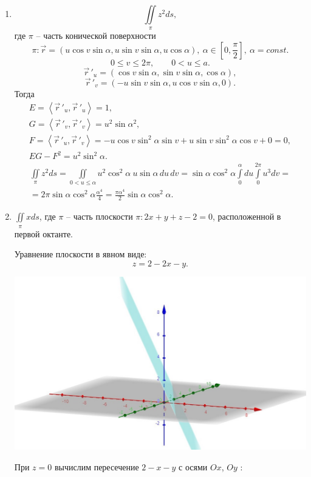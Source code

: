\documentclass[../../main.tex]{subfiles}
\begin{document}
	\begin{exmps}
	
	\,
	
	\begin{enumerate}
	\item
	\[ \iint \limits_\pi z^2 ds,\] где $\pi$ \--- часть конической 
	поверхности
	\[\pi: \vec{r} = (u\cos v\sin \alpha, u\sin v\sin\alpha, 
	u\cos\alpha) , \ 
	  \alpha\in \left[0, \frac{\pi}{2}\right], \ \alpha = const.\] 
	\[0 \leq v \leq 2\pi, \qquad 0 < u \leq a. \]
	\[\vec r\,'_u = (\cos v \sin \alpha, \sin v \sin \alpha, \cos \alpha), \]
	\[\vec r\,'_v = (-u \sin v \sin \alpha, u \cos v \sin \alpha, 0).  \]
	Тогда
	\begin{gather*}
	E = \left<\vec r\,'_u, \vec r\,'_u\right>= 1, \\ G = \left<\vec r\,'_v, \vec 
	r\,'_v\right> = u^2 \sin \alpha^2, \\
	F = \left<\vec r\,'_u, \vec r\,'_v\right> = -u \cos v \sin^2 \alpha \sin 
	v +
	 u \sin v \sin ^2 \alpha \cos v+0 =0, \\
	EG - F^2 = u^2 \sin^2 \alpha.
	\end{gather*}
	\begin{gather*}
	\iint \limits_\pi z^2 ds = \iint\limits_{0<u \leq \alpha} u^2 \cos^2 \alpha
	 \ u \sin \alpha \,du\, dv = \sin \alpha \cos ^2 \alpha \int \limits_0^\alpha 
	 du
	  \int \limits_0 ^{2\pi} u^3 dv = \\ = 2 \pi \sin \alpha \cos ^2 \alpha 
	  \frac{\alpha^4}{4} =
	   \frac{\pi \alpha^4}{2} \sin \alpha \cos^2 \alpha.
	\end{gather*}
	\item 
	$\displaystyle\iint \limits_\pi x ds$, где $\pi$ \--- часть плоскости
	$\pi : 2x+y+z-2=0$, расположенной в первой октанте.
	
	Уравнение плоскости в явном виде:
	\[z = 2 -2x -y.\]
	\begin{center}
	 \includegraphics[scale = 0.2]{lec23-2.jpg}
	\end{center}	
	При $z = 0$ вычислим пересечение $2 -x-y$ с осями $Ox$, $Oy$ :
	

\end{enumerate}
\end{exmps}
\end{document}
